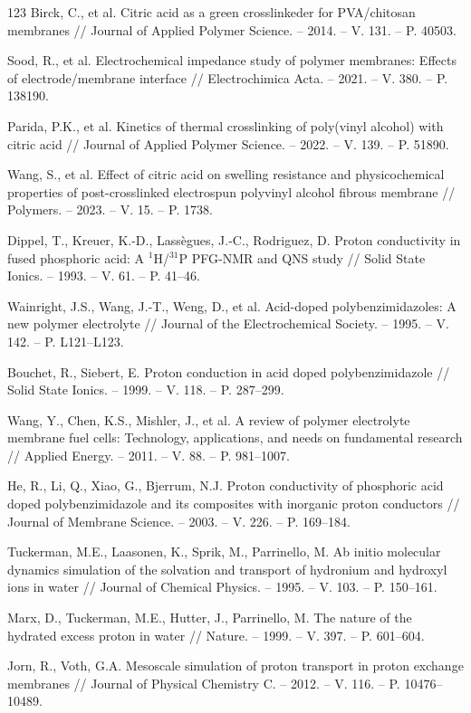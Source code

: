 \documentclass[12pt,a4paper]{report}
\begin{document}
\begin{thebibliography}{123}
 Birck, C., et al. Citric acid as a green crosslinkeder for PVA/chitosan membranes // Journal of Applied Polymer Science. – 2014. – V. 131. – P. 40503.

 Sood, R., et al. Electrochemical impedance study of polymer membranes: Effects of electrode/membrane interface // Electrochimica Acta. – 2021. – V. 380. – P. 138190.

 Parida, P.K., et al. Kinetics of thermal crosslinking of poly(vinyl alcohol) with citric acid // Journal of Applied Polymer Science. – 2022. – V. 139. – P. 51890.

 Wang, S., et al. Effect of citric acid on swelling resistance and physicochemical properties of post-crosslinked electrospun polyvinyl alcohol fibrous membrane // Polymers. – 2023. – V. 15. – P. 1738.

 Dippel, T., Kreuer, K.-D., Lassègues, J.-C., Rodriguez, D. Proton conductivity in fused phosphoric acid: A \(^1\)H/\(^{31}\)P PFG-NMR and QNS study // Solid State Ionics. – 1993. – V. 61. – P. 41–46.

 Wainright, J.S., Wang, J.-T., Weng, D., et al. Acid-doped polybenzimidazoles: A new polymer electrolyte // Journal of the Electrochemical Society. – 1995. – V. 142. – P. L121–L123.

 Bouchet, R., Siebert, E. Proton conduction in acid doped polybenzimidazole // Solid State Ionics. – 1999. – V. 118. – P. 287–299.

 Wang, Y., Chen, K.S., Mishler, J., et al. A review of polymer electrolyte membrane fuel cells: Technology, applications, and needs on fundamental research // Applied Energy. – 2011. – V. 88. – P. 981–1007.

 He, R., Li, Q., Xiao, G., Bjerrum, N.J. Proton conductivity of phosphoric acid doped polybenzimidazole and its composites with inorganic proton conductors // Journal of Membrane Science. – 2003. – V. 226. – P. 169–184.

 Tuckerman, M.E., Laasonen, K., Sprik, M., Parrinello, M. Ab initio molecular dynamics simulation of the solvation and transport of hydronium and hydroxyl ions in water // Journal of Chemical Physics. – 1995. – V. 103. – P. 150–161.

 Marx, D., Tuckerman, M.E., Hutter, J., Parrinello, M. The nature of the hydrated excess proton in water // Nature. – 1999. – V. 397. – P. 601–604.

 Jorn, R., Voth, G.A. Mesoscale simulation of proton transport in proton exchange membranes // Journal of Physical Chemistry C. – 2012. – V. 116. – P. 10476–10489.


\end{thebibliography}
\end{document}

